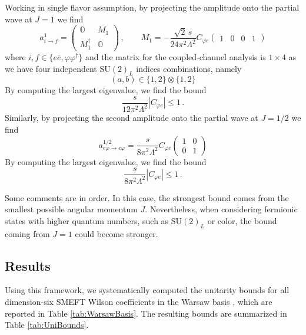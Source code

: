 \documentclass[a4paper,11pt]{article}
\begin{document}
Working in single flavor assumption, by projecting the amplitude onto the partial wave at $J=1$ we find
\begin{equation}
    a^1_{i\to f}=\begin{pmatrix}
        \mathbb{O} & M_1 \\ M^\dag_1 & \mathbb{O}
    \end{pmatrix}\,,\qquad M_1=-\frac{\sqrt{2}\,s}{24\pi^2\Lambda^2} C_{\varphi e}\begin{pmatrix}
        1 & 0 & 0 & 1
    \end{pmatrix}
\end{equation}
where $i,f\in\{e\bar{e},\varphi\varphi^\dag\}$ and the matrix for the coupled-channel analysis is $1\times 4$ as we have four independent $\mathrm{SU}(2)_L$ indices combinations, namely
\begin{equation}
    (a,b)\in\{1,2\}\otimes \{1,2\}
\end{equation}
By computing the largest eigenvalue, we find the bound
\begin{equation}
    \frac{s}{12\pi^2\Lambda^2}|C_{\varphi e}|\leq 1\,.
\end{equation}
Similarly, by projecting the second amplitude onto the partial wave at $J=1/2$ we find
\begin{equation}
    a^{1/2}_{e\varphi\to e\varphi}=\frac{s}{8\pi^2\Lambda^2} C_{\varphi e}\begin{pmatrix}
        1 & 0 \\ 0 & 1
    \end{pmatrix}
\end{equation}
By computing the largest eigenvalue, we find the bound
\begin{equation}
    \frac{s}{8\pi^2\Lambda^2}|C_{\varphi e}|\leq 1\,.
\end{equation}

Some comments are in order. In this case, the strongest bound comes from the smallest possible angular momentum $J$. Nevertheless, when considering fermionic states with higher quantum numbers, such as $\mathrm{SU}(2)_L$ or color, the bound coming from $J=1$ could become stronger. 

\subsection{Results}
Using this framework, we systematically computed the unitarity bounds 
for all dimension-six SMEFT Wilson coefficients in the Warsaw basis \cite{Grzadkowski:2010es}, which are reported in Table \ref{tab:WarsawBasis}. The resulting bounds are summarized in Table \ref{tab:UniBounds}.
\end{document}
